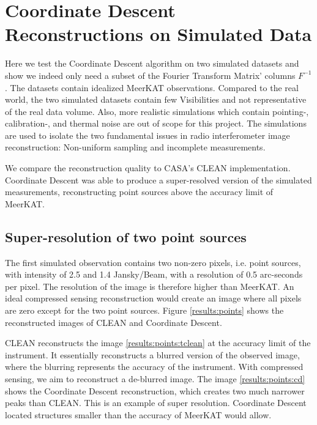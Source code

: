\section{Coordinate Descent Reconstructions on Simulated Data}
Here we test the Coordinate Descent algorithm on two simulated datasets and show we indeed only need a subset of the Fourier Transform Matrix' columns $F^{-1}$. The datasets contain idealized MeerKAT observations. Compared to the real world, the two simulated datasets contain few Visibilities and not representative of the real data volume. Also, more realistic simulations which contain pointing-, calibration-, and thermal noise are out of scope for this project. The simulations are used to isolate the two fundamental issues in radio interferometer image reconstruction: Non-uniform sampling and incomplete measurements.

We compare the reconstruction quality to CASA's CLEAN implementation. Coordinate Descent was able to produce a super-resolved version of the simulated measurements, reconstructing point sources above the accuracy limit of MeerKAT.

\subsection{Super-resolution of two point sources}
The first simulated observation contains two non-zero pixels, i.e. point sources, with intensity of 2.5 and 1.4 Jansky/Beam, with a resolution of 0.5 arc-seconds per pixel. The resolution of the image is therefore higher than MeerKAT. An ideal compressed sensing reconstruction would create an image where all pixels are zero except for the two point sources. Figure \ref{results:points} shows the reconstructed images of CLEAN and Coordinate Descent.

CLEAN reconstructs the image \ref{results:points:tclean} at the accuracy limit of the instrument. It essentially reconstructs a blurred version of the observed image, where the blurring represents the accuracy of the instrument. With compressed sensing, we aim to reconstruct a de-blurred image. The image \ref{results:points:cd} shows the Coordinate Descent reconstruction, which creates two much narrower peaks than CLEAN. This is an example of super resolution. Coordinate Descent located structures smaller than the accuracy of MeerKAT would allow.

